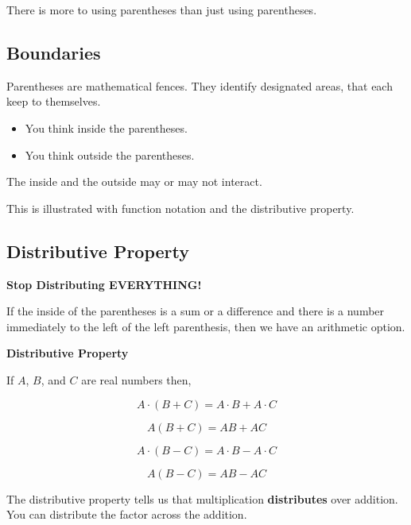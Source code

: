 \documentclass{ximera}
\begin{document}
There is more to using parentheses than just using parentheses. 



\subsection*{Boundaries}


Parentheses are mathematical fences.  They identify designated areas, that each keep to themselves. 

\begin{itemize}
\item You think inside the parentheses. 
\item You think outside the parentheses. 
\end{itemize}



The inside and the outside may or may not interact. 


This is illustrated with function notation and the distributive property. 












\subsection*{Distributive Property} 

\textbf{\textcolor{red!70!black}{Stop Distributing EVERYTHING!}}


If the inside of the parentheses is a sum or a difference and there is a number immediately to the left of the left parenthesis, then we have an arithmetic option.


\begin{template}  \textbf{\textcolor{purple!65!blue}{Distributive Property}} 


If $A$, $B$, and $C$ are real numbers then,

\[
A \cdot (B + C) = A \cdot B + A \cdot C
\]


\[
A (B + C) = A  B + A  C
\]


\[
A \cdot (B - C) = A \cdot B - A \cdot C
\]


\[
A (B - C) = A  B - A  C
\]




\end{template}


The distributive property tells us that multiplication \textbf{distributes} over addition.  You can distribute the factor across the addition. 
\end{document}
